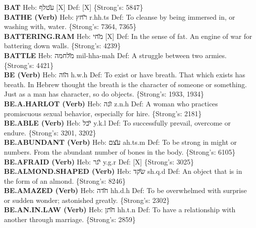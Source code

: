 {\textbf{BAT} Heb: {\large\H עטלף} {[}X{]} Def: {[}X{]} \{Strong's: 5847\}\hfill{}\\

\textbf{BATHE (Verb)} Heb: {\large\H רחץ} r.hh.ts Def: To cleanse by being immersed in, or washing with, water. \{Strong's: 7364, 7365\}\hfill{}\\

\textbf{BATTERING.RAM} Heb: {\large\H מחי} {[}X{]} Def: In the sense of fat. An engine of war for battering down walls. \{Strong's: 4239\}\hfill{}\\

\textbf{BATTLE} Heb: {\large\H מלחמה} mil-hha-mah Def: A struggle between two armies. \{Strong's: 4421\}\hfill{}\\

\textbf{BE (Verb)} Heb: {\large\H הוה} h.w.h Def: To exist or have breath. That which exists has breath. In Hebrew thought the breath is the character of someone or something. Just as a man has character, so do objects. \{Strong's: 1933, 1934\}\hfill{}\\

\textbf{BE.A.HARLOT (Verb)} Heb: {\large\H זנה} z.n.h Def: A woman who practices promiscuous sexual behavior, especially for hire. \{Strong's: 2181\}\hfill{}\\

\textbf{BE.ABLE (Verb)} Heb: {\large\H יכל} y.k.l Def: To successfully prevail, overcome or endure. \{Strong's: 3201, 3202\}\hfill{}\\

\textbf{BE.ABUNDANT (Verb)} Heb: {\large\H עצם} ah.ts.m Def: To be strong in might or numbers. From the abundant number of bones in the body. \{Strong's: 6105\}\hfill{}\\

\textbf{BE.AFRAID (Verb)} Heb: {\large\H יגר} y.g.r Def: {[}X{]} \{Strong's: 3025\}\hfill{}\\

\textbf{BE.ALMOND.SHAPED (Verb)} Heb: {\large\H שקד} sh.q.d Def: An object that is in the form of an almond. \{Strong's: 8246\}\hfill{}\\

\textbf{BE.AMAZED (Verb)} Heb: {\large\H חדה} hh.d.h Def: To be overwhelmed with surprise or sudden wonder; astonished greatly. \{Strong's: 2302\}\hfill{}\\

\textbf{BE.AN.IN.LAW (Verb)} Heb: {\large\H חתן} hh.t.n Def: To have a relationship with another through marriage. \{Strong's: 2859\}\hfill{}\\

}
